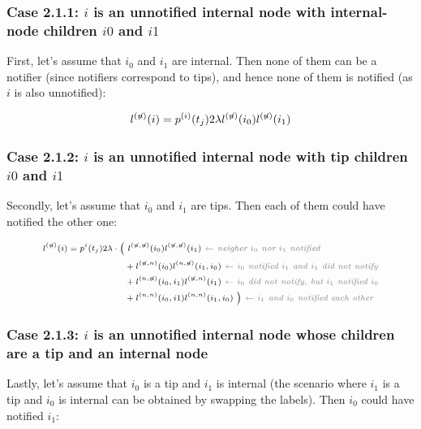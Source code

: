 \documentclass[a4paper,10pt]{article}
\begin{document}

\subsubsection*{Case 2.1.1: $i$ is an unnotified internal node with internal-node children $i0$ and $i1$}

First, let's assume that $i_0$ and $i_1$ are internal. Then none of them can be a notifier (since notifiers correspond to tips), and hence none of them is notified (as $i$ is also unnotified):

\begin{equation}
\scriptsize
l^{(\not{n})}(i) = p^{(i)}(t_j) 2\lambda l^{(\not{n})}(i_0)l^{(\not{n})}(i_1) \label{eq:lu-int-int}
\end{equation}

\subsubsection*{Case 2.1.2: $i$ is an unnotified internal node with tip children $i0$ and $i1$}

Secondly, let's assume that $i_0$ and $i_1$ are tips. Then each of them could have notified the other one:

\begin{equation}
\scriptsize
\begin{split}
l^{(\not{n})}(i) = p^{i}(t_j) 2\lambda \cdot 
\Big(&~l^{(\not{n},\not{n})}(i_0)l^{(\not{n},\not{n})}(i_1) \textit{\color{gray}~$\leftarrow$ neigher $i_0$ nor $i_1$ notified} \\
&+ l^{(\not{n},n)}(i_0)l^{(n,\not{n})}(i_1,i_0) \textit{\color{gray}~$\leftarrow$ $i_0$ notified $i_1$ and $i_1$ did not notify} \\
&+ l^{(n,\not{n})}(i_0,i_1)l^{(\not{n},n)}(i_1) \textit{\color{gray}~$\leftarrow$ $i_0$ did not notify, but $i_1$ notified $i_0$} \\
&+ l^{(n,n)}(i_0,i1)l^{(n,n)}(i_1,i_0)~\Big) \textit{\color{gray}~$\leftarrow$ $i_1$ and $i_0$ notified each other} \\
\end{split}\label{eq:lu-tip-tip}
\end{equation}

\subsubsection*{Case 2.1.3: $i$ is an unnotified internal node whose children are a tip and an internal node}
Lastly, let's assume that $i_0$ is a tip and $i_1$ is internal (the scenario where $i_1$ is a tip and $i_0$ is internal can be obtained by swapping the labels). Then $i_0$ could have notified $i_1$:
\end{document}
